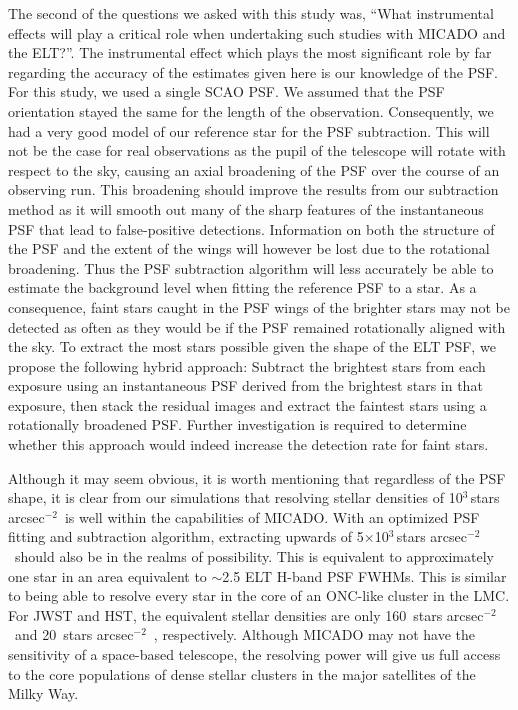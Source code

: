 \documentclass[referee]{aa}
\newcommand{\s}{$\sim$}
\newcommand{\h}[1]{$^{#1}$}
\newcommand{\spa}{stars arcsec$^{-2}$~}
\begin{document}
The second of the questions we asked with this study was, ``What instrumental effects will play a critical role when undertaking such studies with MICADO and the ELT?''.
The instrumental effect which plays the most significant role by far regarding the accuracy of the estimates given here is our knowledge of the PSF\@.
For this study, we used a single SCAO PSF\@.
We assumed that the PSF orientation stayed the same for the length of the observation.
Consequently, we had a very good model of our reference star for the PSF subtraction.
This will not be the case for real observations as the pupil of the telescope will rotate with respect to the sky, causing an axial broadening of the PSF over the course of an observing run.
This broadening should improve the results from our subtraction method as it will smooth out many of the sharp features of the instantaneous PSF that lead to false-positive detections.
Information on both the structure of the PSF and the extent of the wings will however be lost due to the rotational broadening.
Thus the PSF subtraction algorithm will less accurately be able to estimate the background level when fitting the reference PSF to a star.
As a consequence, faint stars caught in the PSF wings of the brighter stars may not be detected as often as they would be if the PSF remained rotationally aligned with the sky.
To extract the most stars possible given the shape of the ELT PSF, we propose the following hybrid approach: Subtract the brightest stars from each exposure using an instantaneous PSF derived from the brightest stars in that exposure, then stack the residual images and extract the faintest stars using a rotationally broadened PSF\@.
Further investigation is required to determine whether this approach would indeed increase the detection rate for faint stars.

Although it may seem obvious, it is worth mentioning that regardless of the PSF shape, it is clear from our simulations that resolving stellar densities of 10\h3\,\spa is well within the capabilities of MICADO\@.
With an optimized PSF fitting and subtraction algorithm, extracting upwards of 5$\times$10\h3\,\spa should also be in the realms of possibility.
This is equivalent to approximately one star in an area equivalent to \s2.5 ELT H-band PSF FWHMs.
This is similar to being able to resolve every star in the core of an ONC-like cluster in the LMC\@.
For JWST and HST, the equivalent stellar densities are only 160~\spa and 20~\spa, respectively.
Although MICADO may not have the sensitivity of a space-based telescope, the resolving power will give us full access to the core populations of dense stellar clusters in the major satellites of the Milky Way.
\end{document}
